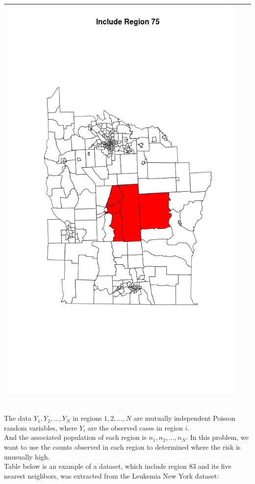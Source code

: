 \documentclass[12pt]{article}
\begin{document}
\begin{tabular}{|c|c|c|}
									\includegraphics[scale=0.2]{ny75.png} && \\
		\hline	
		\end{tabular}	\\
			The data $Y_1,Y_2,\dots,Y_N$ in regions $1,2,\dots,N$ are mutually independent Poisson random variables, where $Y_i$ are the observed cases in region $i$. \\ 
			And the associated population of each region is $n_1,n_2,\dots,n_N$. In this problem, we want to use the counts observed in each region to determined where the risk is unusually high.\\
Table below is an example of a dataset, which include region 83 and its five nearest neighbors, was extracted from the Leukemia New York dataset: \\
\end{document}
